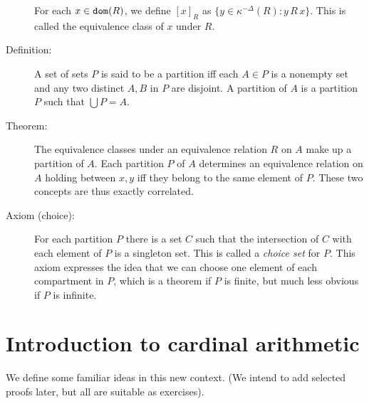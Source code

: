 \documentclass[12pt]{article}
\begin{document}
\begin{description}
For each $x \in {\tt dom}(R)$, we define $[x]_R$ as $\{y\in \kappa^{-\Delta}(R):y \, R\,x\}$.  This is called the equivalence class of $x$ under $R$.

\item[Definition:]  A set of sets $P$ is said to be a partition iff each $A \in P$ is a nonempty set and any two distinct $A,B$ in $P$ are disjoint.  A partition of $A$ is a partition $P$ such that $\bigcup P=A$.

\item[Theorem:]  The equivalence classes under an equivalence relation $R$ on $A$ make up a partition of $A$.
Each partition $P$ of $A$ determines an equivalence relation on $A$ holding between $x,y$ iff they belong to the same element of $P$.  These two concepts are thus exactly correlated.

\item[Axiom (choice):]  For each partition $P$ there is a set $C$ such that the intersection of $C$ with each element of $P$ is a singleton set.  This is called a {\em choice set\/} for $P$.  This axiom expresses the idea that we can choose one element of each compartment in $P$, which is a theorem if $P$ is finite, but much less obvious if $P$ is infinite.

\end{description}

\newpage

\section{Introduction to cardinal arithmetic}

We define some familiar ideas in this new context.  (We intend to add selected proofs later, but all are suitable as exercises).
\end{document}
